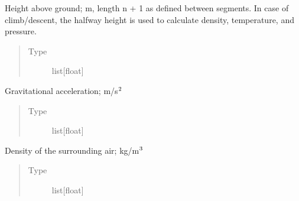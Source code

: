 \documentclass[letterpaper,10pt,english]{sphinxmanual}
\begin{document}
\begin{fulllineitems}
\begin{fulllineitems}
\end{fulllineitems}


\begin{fulllineitems}
\label{\detokenize{modules/mission:mission.Mission.height}}
\sphinxAtStartPar
Height above ground; m, length n + 1 as defined between segments. In
case of climb/descent, the half\sphinxhyphen{}way height is used to calculate
density, temperature, and pressure.
\begin{quote}\begin{description}
\item[{Type}] \leavevmode
\sphinxAtStartPar
list{[}float{]}

\end{description}\end{quote}

\end{fulllineitems}


\begin{fulllineitems}
\label{\detokenize{modules/mission:mission.Mission.gravity}}
\sphinxAtStartPar
Gravitational acceleration; m/s\(\sp{\text{2}}\)
\begin{quote}\begin{description}
\item[{Type}] \leavevmode
\sphinxAtStartPar
list{[}float{]}

\end{description}\end{quote}

\end{fulllineitems}


\begin{fulllineitems}
\label{\detokenize{modules/mission:mission.Mission.density}}
\sphinxAtStartPar
Density of the surrounding air; kg/m\(\sp{\text{3}}\)
\begin{quote}\begin{description}
\item[{Type}] \leavevmode
\sphinxAtStartPar
list{[}float{]}


\end{description}
\end{quote}
\end{fulllineitems}
\end{fulllineitems}
\end{document}

